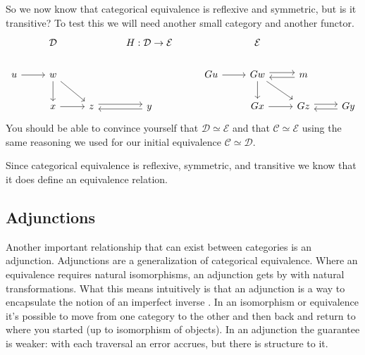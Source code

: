 \documentclass[12pt]{article}
\begin{document}
So we now know that categorical equivalence is reflexive and symmetric, but is it transitive?
To test this we will need another small category and another functor.
\[\begin{tikzcd}
    & {\mathcal{D}} && {H:\mathcal{D}\rightarrow\mathcal{E}} && {\mathcal{E}} \\
    u & w &&& Gu & Gw & m \\
    & x & z & y && Gx & Gz & Gy
    \arrow[from=2-6, to=3-6]
    \arrow[from=2-1, to=2-2]
    \arrow[from=2-2, to=3-2]
    \arrow[from=3-2, to=3-3]
    \arrow[from=2-2, to=3-3]
    \arrow[shift left, from=3-3, to=3-4]
    \arrow[shift left, from=3-4, to=3-3]
    \arrow[from=2-6, to=3-7]
    \arrow[from=3-6, to=3-7]
    \arrow[from=2-5, to=2-6]
    \arrow[shift left, from=2-6, to=2-7]
    \arrow[shift left, from=2-7, to=2-6]
    \arrow[shift left, from=3-7, to=3-8]
    \arrow[shift left, from=3-8, to=3-7]
  \end{tikzcd}\]
You should be able to convince yourself that $\mathcal{D}\simeq\mathcal{E}$ and that $\mathcal{C}\simeq\mathcal{E}$ using the same reasoning we used for our initial equivalence $\mathcal{C}\simeq\mathcal{D}$.

Since categorical equivalence is reflexive, symmetric, and transitive we know that it does define an equivalence relation.



\subsection*{Adjunctions}
Another important relationship that can exist between categories is an adjunction.
Adjunctions are a generalization of categorical equivalence.
Where an equivalence requires natural isomorphisms, an adjunction gets by with natural transformations.
What this means intuitively is that an adjunction is a way to encapsulate the notion of an imperfect inverse \cite{fong2019invitation}.
In an isomorphism or equivalence it's possible to move from one category to the other and then back and return to where you started (up to isomorphism of objects).
In an adjunction the guarantee is weaker: with each traversal an error accrues, but there is structure to it.
\end{document}
